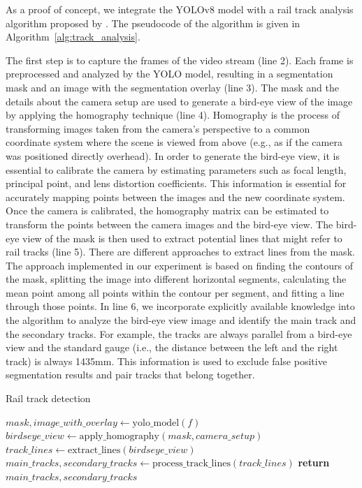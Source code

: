 \documentclass[Master,MDS,english]{BASE/twbook} %
\begin{document}
As a proof of concept, we integrate the YOLOv8 model with a rail track analysis algorithm proposed by \cite{danieles_algorithm}. The pseudocode of the algorithm is given in Algorithm~\ref{alg:track_analysis}.

The first step is to capture the frames of the video stream (line 2). Each frame is preprocessed and analyzed by the YOLO model, resulting in a segmentation mask and an image with the segmentation overlay (line 3). The mask and the details about the camera setup are used to generate a bird-eye view of the image by applying the homography technique (line 4). 
Homography is the process of transforming images taken from the camera's perspective to a common coordinate system where the scene is viewed from above (e.g., as if the camera was positioned directly overhead).
In order to generate the bird-eye view, it is essential to calibrate the camera by estimating parameters such as focal length, principal point, and lens distortion coefficients. This information is essential for accurately mapping points between the images and the new coordinate system. Once the camera is calibrated, the homography matrix can be estimated to transform the points between the camera images and the bird-eye view.
The bird-eye view of the mask is then used to extract potential lines that might refer to rail tracks (line 5). There are different approaches to extract lines from the mask. The approach implemented in our experiment is based on finding the contours of the mask, splitting the image into different horizontal segments, calculating the mean point among all points within the contour per segment, and fitting a line through those points. In line 6, we incorporate explicitly available knowledge into the algorithm to analyze the bird-eye view image and identify the main track and the secondary tracks. For example, the tracks are always parallel from a bird-eye view and the standard gauge (i.e., the distance between the left and the right track) is always 1435mm. This information is used to exclude false positive segmentation results and pair tracks that belong together.


\begin{algorithm}[H]
\caption{Rail track detection}\label{alg:track_analysis}
\begin{algorithmic}[1]
\State $mask, image\_with\_overlay \gets \text{yolo\_model}(f)$
\State $birdseye\_view \gets \text{apply\_homography}(mask, camera\_setup)$
\State $track\_lines \gets \text{extract\_lines}(birdseye\_view)$
\State $main\_tracks, secondary\_tracks \gets \text{process\_track\_lines}(track\_lines)$
\EndWhile
\State \textbf{return} $main\_tracks, secondary\_tracks$ %
\EndProcedure
\end{algorithmic}
\end{algorithm}
\end{document}

